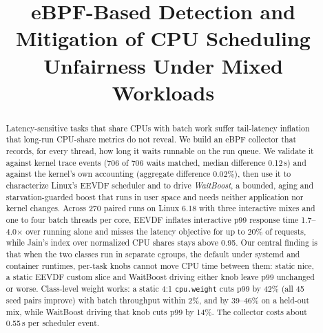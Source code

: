 \documentclass[conference]{IEEEtran}
\newcommand{\us}{\,\textmu s}
\newcommand{\cpuweight}{\texttt{cpu.weight}}
\begin{document}
\title{eBPF-Based Detection and Mitigation of CPU Scheduling Unfairness Under Mixed Workloads}

\author{%
}

\maketitle

\begin{abstract}
Latency-sensitive tasks that share CPUs with batch work suffer tail-latency inflation that long-run CPU-share metrics do not reveal. We build an eBPF collector that records, for every thread, how long it waits runnable on the run queue. We validate it against kernel trace events (706 of 706 waits matched, median difference 0.12\us) and against the kernel's own accounting (aggregate difference 0.02\%), then use it to characterize Linux's EEVDF scheduler and to drive \emph{WaitBoost}, a bounded, aging and starvation-guarded boost that runs in user space and needs neither application nor kernel changes. Across 270 paired runs on Linux 6.18 with three interactive mixes and one to four batch threads per core, EEVDF inflates interactive p99 response time 1.7--4.0$\times$ over running alone and misses the latency objective for up to 20\% of requests, while Jain's index over normalized CPU shares stays above 0.95. Our central finding is that when the two classes run in separate cgroups, the default under systemd and container runtimes, per-task knobs cannot move CPU time between them: static nice, a static EEVDF custom slice and WaitBoost driving either knob leave p99 unchanged or worse. Class-level weight works: a static 4:1 \cpuweight{} cuts p99 by 42\% (all 45 seed pairs improve) with batch throughput within 2\%, and by 39--46\% on a held-out mix, while WaitBoost driving that knob cuts p99 by 14\%. The collector costs about 0.55\us{} per scheduler event.
\end{abstract}
\end{document}
